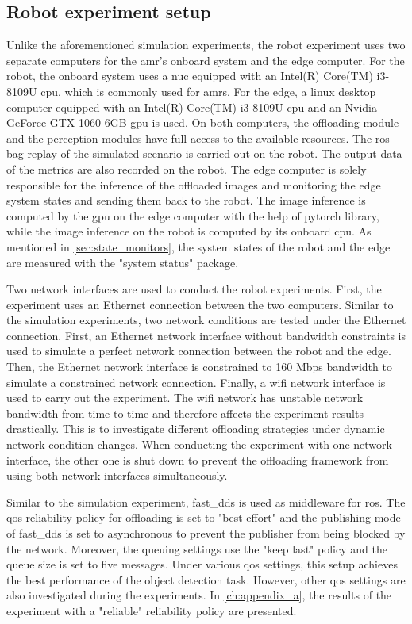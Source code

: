 \subsection{Robot experiment setup}

Unlike the aforementioned simulation experiments, the robot experiment uses two separate computers for the \gls{amr}'s onboard system and the edge computer. For the robot, the onboard system uses a \gls{nuc} equipped with an Intel(R) Core(TM) i3-8109U \gls{cpu}, which is commonly used for \glspl{amr}.  For the edge, a \gls{linux} desktop computer equipped with an Intel(R) Core(TM) i3-8109U \gls{cpu} and an Nvidia GeForce GTX 1060 6GB \gls{gpu} is used. On both computers, the offloading module and the perception modules have full access to the available resources. The \gls{ros} bag replay of the simulated scenario is carried out on the robot. The output data of the metrics are also recorded on the robot. The edge computer is solely responsible for the inference of the offloaded images and monitoring the edge system states and sending them back to the robot. The image inference is computed by the \gls{gpu} on the edge computer with the help of \gls{pytorch} library, while the image inference on the robot is computed by its onboard \gls{cpu}. As mentioned in \cref{sec:state_monitors}, the system states of the robot and the edge are measured with the "system status" package.

Two network interfaces are used to conduct the robot experiments. First, the experiment uses an Ethernet connection between the two computers. Similar to the simulation experiments, two network conditions are tested under the Ethernet connection. First, an Ethernet network interface without bandwidth constraints is used to simulate a perfect network connection between the robot and the edge. Then, the Ethernet network interface is constrained to 160 Mbps bandwidth to simulate a constrained network connection. Finally, a \gls{wifi} network interface is used to carry out the experiment. The \gls{wifi} network has unstable network bandwidth from time to time and therefore affects the experiment results drastically. This is to investigate different offloading strategies under dynamic network condition changes. When conducting the experiment with one network interface, the other one is shut down to prevent the offloading framework from using both network interfaces simultaneously. 

Similar to the simulation experiment, \gls{fast_dds} is used as middleware for \gls{ros}. The \gls{qos} reliability policy for offloading is set to "best effort" and the publishing mode of \gls{fast_dds} is set to asynchronous to prevent the publisher from being blocked by the network. Moreover, the queuing settings use the "keep last" policy and the queue size is set to five messages. Under various \gls{qos} settings, this setup achieves the best performance of the object detection task. However, other \gls{qos} settings are also investigated during the experiments. In \cref{ch:appendix_a}, the results of the experiment with a "reliable" reliability policy are presented. 

